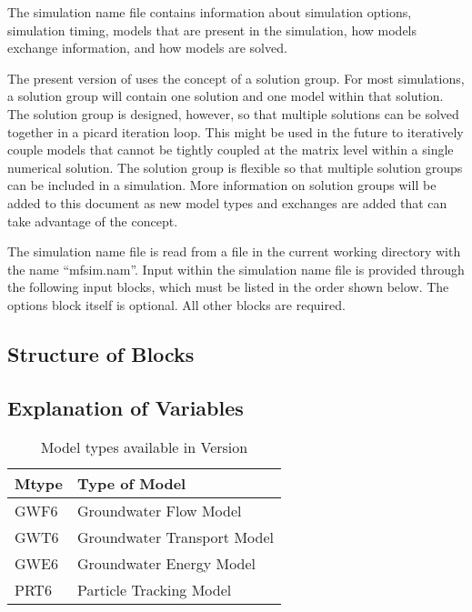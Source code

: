 The simulation name file contains information about simulation options, simulation timing, models that are present in the simulation, how models exchange information, and how models are solved.

The present version of \mf uses the concept of a solution group.  For most simulations, a solution group will contain one solution and one model within that solution.  The solution group is designed, however, so that multiple solutions can be solved together in a picard iteration loop.  This might be used in the future to iteratively couple models that cannot be tightly coupled at the matrix level within a single numerical solution.  The solution group is flexible so that multiple solution groups can be included in a simulation.  More information on solution groups will be added to this document as new model types and exchanges are added that can take advantage of the concept.

The simulation name file is read from a file in the current working directory with the name ``mfsim.nam''.  Input within the simulation name file is provided through the following input blocks, which must be listed in the order shown below.  The options block itself is optional.  All other blocks are required.

\vspace{5mm}
\subsection{Structure of Blocks}






\vspace{5mm}
\subsection{Explanation of Variables}
\begin{description}

\end{description}

\begin{table}[h]
\caption{Model types available in Version \modflowversion}
\small
\begin{center}
\begin{tabular*}{\columnwidth}{l l}
\hline
\hline
Mtype & Type of Model \\
\hline
GWF6 & Groundwater Flow Model \\
GWT6 & Groundwater Transport Model \\
GWE6 & Groundwater Energy Model \\
PRT6 & Particle Tracking Model \\
\hline 
\end{tabular*}
\label{table:mtype}
\end{center}
\normalsize
\end{table}

